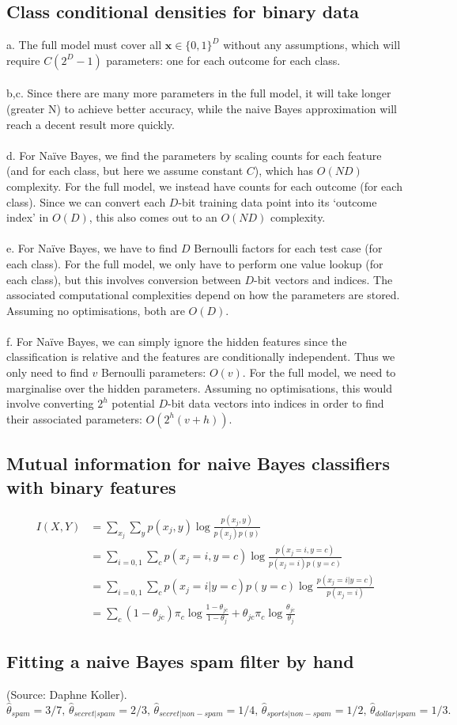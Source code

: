 \subsection{Class conditional densities for binary data}
a. The full model must cover all $\mathbf{x} \in \{0,1\}^D$ without any assumptions, which will require $C(2^D-1)$ parameters: one for each outcome for each class.\\\\
b,c. Since there are many more parameters in the full model, it will take longer (greater N) to achieve better accuracy, while the naive Bayes approximation will reach a decent result more quickly.\\\\
d. For Na\"ive Bayes, we find the parameters by scaling counts for each feature (and for each class, but here we assume constant $C$), which has $O(ND)$ complexity. For the full model, we instead have counts for each outcome (for each class). Since we can convert each $D$-bit training data point into its `outcome index' in $O(D)$, this also comes out to an $O(ND)$ complexity.\\\\
e. For Na\"ive Bayes, we have to find $D$ Bernoulli factors for each test case (for each class). For the full model, we only have to perform one value lookup (for each class), but this involves conversion between $D$-bit vectors and indices. The associated computational complexities depend on how the parameters are stored. Assuming no optimisations, both are $O(D)$.\\\\
f. For Na\"ive Bayes, we can simply ignore the hidden features since the classification is relative and the features are conditionally independent. Thus we only need to find $v$ Bernoulli parameters: $O(v)$. For the full model, we need to marginalise over the hidden parameters. Assuming no optimisations, this would involve converting $2^h$ potential $D$-bit data vectors into indices in order to find their associated parameters: $O(2^h(v+h))$.

\subsection{Mutual information for naive Bayes classifiers with binary features}
\begin{align*}
I(X,Y) &= \sum_{x_j} \sum_y p(x_j,y) \log\frac{p(x_j,y)}{p(x_j)p(y)}\\
&= \sum_{i=0,1} \sum_c p(x_j=i,y=c) \log\frac{p(x_j=i,y=c)}{p(x_j=i)p(y=c)}\\
&= \sum_{i=0,1} \sum_c p(x_j=i|y=c)p(y=c) \log\frac{p(x_j=i|y=c)}{p(x_j=i)}\\
&= \sum_c (1-\theta_{jc}) \pi_c \log\frac{1-\theta_{jc}}{1-\theta_j} + \theta_{jc} \pi_c \log\frac{\theta_{jc}}{\theta_j}
\end{align*}

\subsection{Fitting a naive Bayes spam filter by hand}
(Source: Daphne Koller). $\hat\theta_{spam} = 3/7,\, \hat\theta_{secret|spam} = 2/3,\, \hat\theta_{secret|non-spam} = 1/4,\, \hat\theta_{sports|non-spam} = 1/2,\, \hat\theta_{dollar|spam} = 1/3.$
